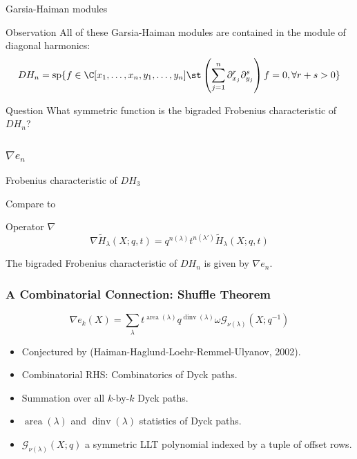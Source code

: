 \documentclass{beamer}
\renewcommand{\Span}{\operatorname{sp}}
\DeclareMathOperator{\area}{area}
\DeclareMathOperator{\dinv}{dinv}
\newcommand{\Gcal}{\mathcal{G}}
\newcounter{c}
\begin{document}
  \begin{frame}{Garsia-Haiman modules}
  \begin{block}{Observation}
    All of these Garsia-Haiman modules are contained in the module of
    diagonal harmonics:  \[
      DH_n = \Span\{ f \in \C[x_1,\ldots,x_n,y_1,\ldots,y_n] \st
      \left(\sum_{j=1}^n \partial_{x_j}^r \partial_{y_j}^s\right) f = 0, \forall r+s>0\}
    \]
  \end{block}\pause
  \begin{block}{Question}
    What symmetric function is the bigraded Frobenius characteristic
    of \(DH_n\)?
  \end{block}
\end{frame}
\begin{frame}
  \frametitle{\(\nabla e_n\)}
  Frobenius characteristic of \(DH_3\)\pause
  \begin{center}
    \pause
\end{center}
Compare to
\begin{center}
  \end{center}\pause
  \begin{block}{Operator \(\nabla\)}
    \[
      \nabla \tilde{H}_\lambda(X;q,t) = q^{n(\lambda)} t^{n(\lambda')} \tilde{H}_\lambda(X;q,t)
    \]
  \end{block}\pause
  \begin{theorem}[Haiman, 2002]
    The bigraded Frobenius characteristic of \(DH_n\) is given by \(\nabla e_n\).
  \end{theorem}
\end{frame}
\begin{frame}
  \frametitle{A Combinatorial Connection: Shuffle Theorem}
  \begin{theorem}
    \[
      \nabla e_k(X) = \sum_\lambda t^{\area(\lambda)}q^{\dinv(\lambda)}
      \omega \Gcal_{\nu(\lambda)}(X;q^{-1})
    \]
  \end{theorem}
  \begin{itemize}
  \item Conjectured by (Haiman-Haglund-Loehr-Remmel-Ulyanov, 2002).\pause
  \item Combinatorial RHS: Combinatorics of Dyck paths. \pause
  \item Summation over all \(k\)-by-\(k\) Dyck paths.\pause
  \item \(\area(\lambda)\) and \(\dinv(\lambda)\) statistics of Dyck paths.\pause
  \item \(\Gcal_{\nu(\lambda)}(X;q)\) a symmetric LLT polynomial
    indexed by a tuple of offset rows.
  \end{itemize}
\end{frame}
\end{document}
